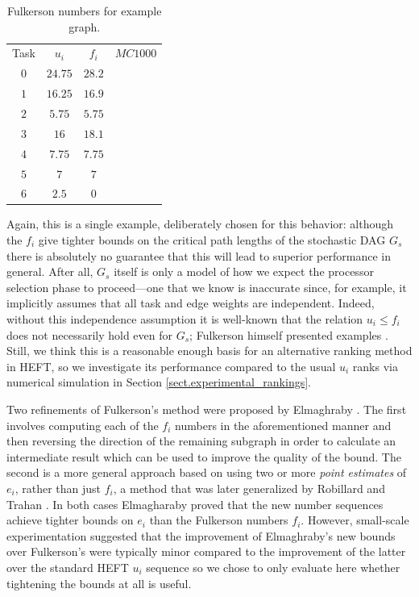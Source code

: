 \documentclass[12pt]{article}
\begin{document}
\begin{table}
	\caption{Fulkerson numbers for example graph.} 
	\begin{center}	
		\begin{tabular}{c c c c}
			\cmidrule{1-4}
			Task & $u_i$ & $f_i$ & $MC1000$\\
			\cmidrule{1-4}
			$0$ & $24.75$ & $28.2$ & \\
			$1$ & $16.25$ & $16.9$ & \\
			$2$ & $5.75$ & $5.75$ &\\
			$3$ & $16$ & $18.1$ &\\
			$4$ & $7.75$ & $7.75$ &\\
			$5$ & $7$ & $7$ &\\
			$6$ & $2.5$ & $0$ &\\
			\bottomrule
		\end{tabular}
		\label{tb.fulk_example}
	\end{center}	
\end{table} 

Again, this is a single example, deliberately chosen for this behavior: although the $f_i$ give tighter bounds on the critical path lengths of the stochastic DAG $G_s$ there is absolutely no guarantee that this will lead to superior performance in general. After all, $G_s$ itself is only a model of how we expect the processor selection phase to proceed---one that we know is inaccurate since, for example, it implicitly assumes that all task and edge weights are independent. Indeed, without this independence assumption it is well-known that the relation $u_i \leq f_i$ does not necessarily hold even for $G_s$; Fulkerson himself presented examples \cite{fulk62}. Still, we think this is a reasonable enough basis for an alternative ranking method in HEFT, so we investigate its performance compared to the usual $u_i$ ranks via numerical simulation in Section \ref{sect.experimental_rankings}.   

Two refinements of Fulkerson's method were proposed by Elmaghraby \cite{elmaghraby67}. The first involves computing each of the $f_i$ numbers in the aforementioned manner and then reversing the direction of the remaining subgraph in order to calculate an intermediate result which can be used to improve the quality of the bound. The second is a more general approach based on using two or more {\em point estimates} of $e_i$, rather than just $f_i$, a method that was later generalized by Robillard and Trahan \cite{robillard76}. In both cases Elmagharaby proved that the new number sequences achieve tighter bounds on $e_i$ than the Fulkerson numbers $f_i$. However, small-scale experimentation suggested that the improvement of Elmaghraby's new bounds over Fulkerson's were typically minor compared to the improvement of the latter over the standard HEFT $u_i$ sequence so we chose to only evaluate here whether tightening the bounds at all is useful.
\end{document}
